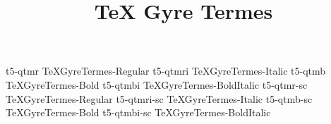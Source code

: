 \documentclass[test]{vnsample}
\title{TeX Gyre Termes}
\begin{document}
\begin{shortsample}
    {t5-qtmr}     {TeXGyreTermes-Regular}
   {t5-qtmri}    {TeXGyreTermes-Italic}
    {t5-qtmb}     {TeXGyreTermes-Bold}
   {t5-qtmbi}    {TeXGyreTermes-BoldItalic}
   {t5-qtmr-sc}  {TeXGyreTermes-Regular}
 {t5-qtmri-sc} {TeXGyreTermes-Italic}
   {t5-qtmb-sc}  {TeXGyreTermes-Bold}
 {t5-qtmbi-sc} {TeXGyreTermes-BoldItalic}
\end{shortsample}
\end{document}

